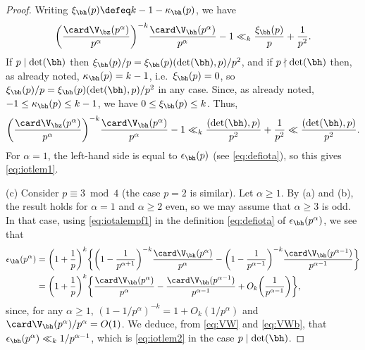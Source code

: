 \documentclass[12pt, reqno, twoside, letterpaper]{amsart}
\begin{document}
\begin{proof}
Writing $\xi_{\bh}(p) \defeq k - 1 - \kappa_{\bh}(p)$, we have
\[
  \bigg(\frac{\card \V_{\bz}(p^{\alpha})}{p^{\alpha}}\bigg)^{-k}
   \frac{\card \V_{\bh}(p^{\alpha})}{p^{\alpha}}
  -
    1
  \ll_k 
     \frac{\xi_{\bh}(p)}{p} + \frac{1}{p^2}.
\]
%
If $p \mid \det(\bh)$ then 
$\xi_{\bh}(p)/p = \xi_{\bh}(p)(\det(\bh),p)/p^2$, and if 
$p \nmid \det(\bh)$ then, as already noted, 
$\kappa_{\bh}(p) = k - 1$, i.e.\ $\xi_{\bh}(p) = 0$, so 
$\xi_{\bh}(p)/p = \xi_{\bh}(p)(\det(\bh),p)/p^2$ in any case.
%
Since, as already noted, 
$-1 \le \kappa_{\bh}(p) \le k - 1$, 
we have $0 \le \xi_{\bh}(p) \le k$.
%
Thus, 
\[
  \bigg(\frac{\card \V_{\bz}(p^{\alpha})}{p^{\alpha}}\bigg)^{-k}
   \frac{\card \V_{\bh}(p^{\alpha})}{p^{\alpha}}
  -
    1
  \ll_k 
   \frac{(\det(\bh),p)}{p^2} + \frac{1}{p^2} 
    \ll
     \frac{(\det(\bh),p)}{p^2}.
\]
%
For $\alpha = 1$, the left-hand side is equal to $\epsilon_{\bh}(p)$ 
(see \eqref{eq:defiota}), so this gives \eqref{eq:iotlem1}.

(c)
%
Consider $p \equiv 3 \bmod 4$ (the case $p = 2$ is similar).
%
Let $\alpha \ge 1$.
%
By (a) and (b), the result holds for $\alpha = 1$ and 
$\alpha \ge 2$ even, so we may assume that $\alpha \ge 3$ is odd.
%
In that case, using \eqref{eq:iotalempf1} in the definition 
\eqref{eq:defiota} of $\epsilon_{\bh}(p^{\alpha})$, we see that 
\begin{align*}
 \epsilon_{\bh}(p^{\alpha})
 & 
  =
   \bigg(1 + \frac{1}{p}\bigg)^k
    \bigg\{
     \bigg(1 - \frac{1}{p^{\alpha + 1}}\bigg)^{-k}
      \frac{\card \V_{\bh}(p^{\alpha})}{p^{\alpha}}
       -
        \bigg(1 - \frac{1}{p^{\alpha - 1}}\bigg)^{-k}
         \frac{\card \V_{\bh}(p^{\alpha - 1})}{p^{\alpha - 1}}
    \bigg\}
 \\
 & 
  =
   \bigg(1 + \frac{1}{p}\bigg)^k
    \bigg\{
     \frac{\card \V_{\bh}(p^{\alpha})}{p^{\alpha}}
       -
       \frac{\card \V_{\bh}(p^{\alpha - 1})}{p^{\alpha - 1}}
        +
         O_k\bigg(\frac{1}{p^{\alpha - 1}}\bigg) 
    \bigg\},   
\end{align*}
since, for any $\alpha \ge 1$, 
$(1 - 1/p^{\alpha})^{-k} = 1 + O_k(1/p^{\alpha})$ and 
$\card \V_{\bh}(p^{\alpha})/p^{\alpha} = O(1)$.
%
We deduce, from \eqref{eq:VW} and \eqref{eq:VWb}, that  
$\epsilon_{\bh}(p^{\alpha}) \ll_k 1/p^{\alpha - 1}$, which is   
\eqref{eq:iotlem2} in the case $p \mid \det(\bh)$.


\end{proof}
\end{document}
